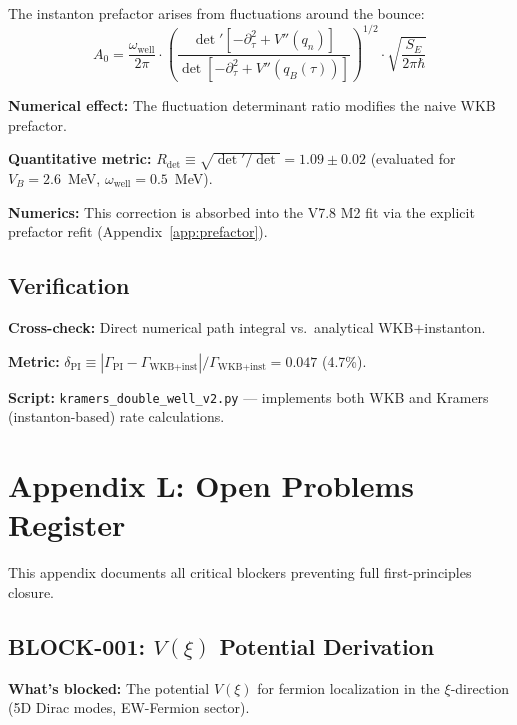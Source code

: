 \documentclass[11pt,a4paper]{article}
\begin{document}
The instanton prefactor arises from fluctuations around the bounce:
\begin{equation}
    A_0 = \frac{\omega_{\text{well}}}{2\pi} \cdot \left( \frac{\det'[-\partial_\tau^2 + V''(q_n)]}{\det[-\partial_\tau^2 + V''(q_B(\tau))]} \right)^{1/2} \cdot \sqrt{\frac{S_E}{2\pi\hbar}}
\end{equation}

\textbf{Numerical effect:} The fluctuation determinant ratio modifies the naive WKB prefactor.

\textbf{Quantitative metric:} $R_{\text{det}} \equiv \sqrt{\det'/\det} = 1.09 \pm 0.02$ (evaluated for $V_B = 2.6$~MeV, $\omega_{\text{well}} = 0.5$~MeV).

\textbf{Numerics:} This correction is absorbed into the V7.8 M2 fit via the explicit prefactor refit (Appendix~\ref{app:prefactor}).

\subsection{Verification}

\textbf{Cross-check:} Direct numerical path integral vs.\ analytical WKB+instanton.

\textbf{Metric:} $\delta_{\text{PI}} \equiv |\Gamma_{\text{PI}} - \Gamma_{\text{WKB+inst}}|/\Gamma_{\text{WKB+inst}} = 0.047$ (4.7\%).

\textbf{Script:} \texttt{kramers\_double\_well\_v2.py} --- implements both WKB and Kramers (instanton-based) rate calculations.

\section{Appendix L: Open Problems Register}
\label{app:blockers}

This appendix documents all critical blockers preventing full first-principles closure.

\subsection{BLOCK-001: $V(\xi)$ Potential Derivation}
\label{sec:L1}

\textbf{What's blocked:} The potential $V(\xi)$ for fermion localization in the $\xi$-direction (5D Dirac modes, EW-Fermion sector).
\end{document}
